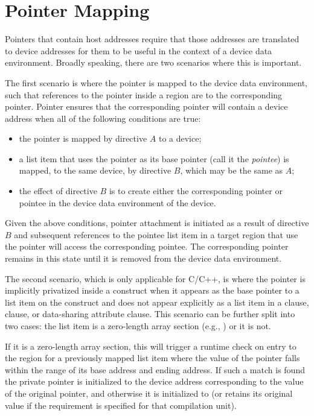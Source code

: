 \pagebreak
\section{Pointer Mapping}
\label{sec:pointer_mapping}

Pointers that contain host addresses require that those addresses are translated to device addresses for them to be useful in the context of a device data environment. Broadly speaking, there are two scenarios where this is important.

The first scenario is where the pointer is mapped to the device data environment, such that references to the pointer inside a  region are to the corresponding pointer. Pointer  ensures that the corresponding pointer will contain a device address when all of the following conditions are true:
\begin{itemize}
 \item the pointer is mapped by directive $A$ to a device;
 \item a list item that uses the pointer as its base pointer (call it the \emph{pointee}) is mapped, to the same device, by directive $B$, which may be the same as $A$;
 \item the effect of directive $B$ is to create either the corresponding pointer or pointee in the device data environment of the device.
\end{itemize}

Given the above conditions, pointer attachment is initiated as a result of directive $B$ and subsequent references to the pointee list item in a target region that use the pointer will access the corresponding pointee. The corresponding pointer remains in this  state until it is removed from the device data environment.

The second scenario, which is only applicable for C/C++, is where the pointer is implicitly privatized inside a  construct when it appears as the base pointer to a list item on the construct and does not appear explicitly as a list item in a  clause,  clause, or data-sharing attribute clause. This scenario can be further split into two cases: the list item is a zero-length array section (e.g., ) or it is not.

If it is a zero-length array section, this will trigger a runtime check on entry to the  region for a previously mapped list item where the value of the pointer falls within the range of its base address and ending address. If such a match is found the private pointer is initialized to the device address corresponding to the value of the original pointer, and otherwise it is initialized to  (or retains its original value if the  requirement is specified for that compilation unit).

